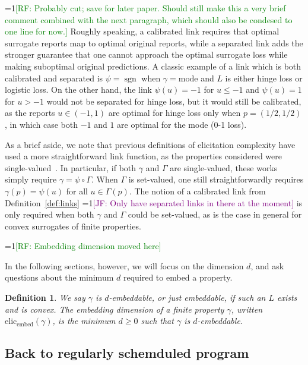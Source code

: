 \documentclass[12pt]{article}
\newcommand{\Comments}{1}
\newcommand{\mynote}[2]{\ifnum\Comments=1\textcolor{#1}{#2}\fi}
\newcommand{\raf}[1]{\mynote{green}{[RF: #1]}}
\newcommand{\jessie}[1]{\mynote{purple}{[JF: #1]}}
\newcommand{\elicembed}{\mathrm{elic}_\mathrm{embed}}
\newcommand{\mode}{\mathrm{mode}}
\DeclareMathOperator*{\sgn}{sgn}
\newtheorem{definition}{Definition}
\begin{document}
\raf{Probably cut; save for later paper.  Should still make this a very brief comment combined with the next paragraph, which should also be condesed to one line for now.}
Roughly speaking, a calibrated link requires that optimal surrogate reports map to optimal original reports, while a separated link adds the stronger guarantee that one cannot approach the optimal surrogate loss while making suboptimal original predictions.
A classic example of a link which is both calibrated and separated is $\psi = \sgn$ when $\gamma=\mode$ and $L$ is either hinge loss or logistic loss.
On the other hand, the link $\psi(u) =-1$ for $u \leq -1$ and $\psi(u) = 1$ for $u > -1$
would not be separated for hinge loss, but it would still be calibrated, as the reports $u\in(-1,1)$ are optimal for hinge loss only when $p=(1/2,1/2)$, in which case both $-1$ and $1$ are optimal for the mode (0-1 loss).

As a brief aside, we note that previous definitions of elicitation complexity have used a more straightforward link function, as the properties considered were single-valued~\citep{lambert2008eliciting,fissler2016higher,frongillo2015elicitation}.
In particular, if both $\gamma$ and $\Gamma$ are single-valued, these works simply require $\gamma = \psi \circ \Gamma$.
When $\Gamma$ is set-valued, one still straightforwardly requires $\gamma(p) = \psi(u)$ for all $u \in \Gamma(p)$.
The notion of a calibrated link from Definition~\ref{def:links} \jessie{Only have separated links in there at the moment} is only required when both $\gamma$ and $\Gamma$ could be set-valued, as is the case in general for convex surrogates of finite properties.

\raf{Embedding dimension moved here}

In the following sections, however, we will focus on the dimension $d$, and ask questions about the minimum $d$ required to embed a property.

\begin{definition}\label{def:embedding-dim}
  We say $\gamma$ is \emph{$d$-embeddable}, or just \emph{embeddable}, if such an $L$ exists and is convex.
  The \emph{embedding dimension} of a finite property $\gamma$, written $\elicembed(\gamma)$, is the minimum $d\geq 0$ such that $\gamma$ is $d$-embeddable.
\end{definition}


\subsection*{Back to regularly schemduled program}
\end{document}

